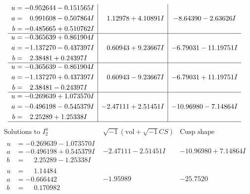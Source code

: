 \documentclass[1p]{elsarticle_modified}
\theoremstyle{definition}
\newcommand{\I}{\sqrt{-1}}
\begin{document}
$$\begin{array}{c|c|c}
\begin{aligned}
u &= -0.952644 - 0.151565 I \\
a &= \phantom{-}0.991608 - 0.507864 I \\
b &= -0.485665 + 0.510762 I\end{aligned}
 & \phantom{-}1.12978 + 4.10891 I & -8.64390 - 2.63626 I \\ \hline\begin{aligned}
u &= -0.365639 + 0.861904 I \\
a &= -1.137270 - 0.437397 I \\
b &= \phantom{-}2.38481 + 0.24397 I\end{aligned}
 & \phantom{-}0.60943 + 9.23667 I & -6.79031 - 11.19751 I \\ \hline\begin{aligned}
u &= -0.365639 - 0.861904 I \\
a &= -1.137270 + 0.437397 I \\
b &= \phantom{-}2.38481 - 0.24397 I\end{aligned}
 & \phantom{-}0.60943 - 9.23667 I & -6.79031 + 11.19751 I \\ \hline\begin{aligned}
u &= -0.269639 + 1.073570 I \\
a &= -0.496198 - 0.545379 I \\
b &= \phantom{-}2.25289 + 1.25338 I\end{aligned}
 & -2.47111 + 2.51451 I & -10.96980 - 7.14864 I\\
 \hline 
 \end{array}$$\newpage$$\begin{array}{c|c|c}  
\text{Solutions to }I^u_{2}& \I (\text{vol} + \sqrt{-1}CS) & \text{Cusp shape}\\
 \hline 
\begin{aligned}
u &= -0.269639 - 1.073570 I \\
a &= -0.496198 + 0.545379 I \\
b &= \phantom{-}2.25289 - 1.25338 I\end{aligned}
 & -2.47111 - 2.51451 I & -10.96980 + 7.14864 I \\ \hline\begin{aligned}
u &= \phantom{-}1.14484\phantom{ +0.000000I} \\
a &= -0.666442\phantom{ +0.000000I} \\
b &= \phantom{-}0.170982\phantom{ +0.000000I}\end{aligned}
 & -1.95989\phantom{ +0.000000I} & -25.7520\phantom{ +0.000000I} \\ \hline\begin{aligned}

\end{aligned}
\end{array}$$
\end{document}

